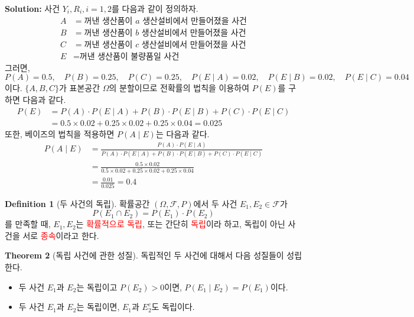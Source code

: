 \documentclass{article}
\theoremstyle{definition}
\newtheorem{theorem}{Theorem}
\newtheorem{definition}[theorem]{Definition}
\begin{document}
\noindent
\textbf{Solution:} 사건 $Y_i, R_i, i = 1, 2$를 다음과 같이 정의하자.
\begin{align*}
    A &= \text{꺼낸 생산품이 $a$ 생산설비에서 만들어졌을 사건}\\
    B &= \text{꺼낸 생산품이 $b$ 생산설비에서 만들어졌을 사건}\\
    C &= \text{꺼낸 생산품이 $c$ 생산설비에서 만들어졌을 사건}\\
    E &= \text{꺼낸 생산품이 불량품일 사건}
\end{align*}
그러면,
\begin{equation*}
    P(A) = 0.5, \quad P(B) = 0.25, \quad P(C) = 0.25, \quad P(E \mid A) = 0.02, \quad P(E \mid B) = 0.02, \quad P(E \mid C) = 0.04
\end{equation*}
이다. $\{A, B, C\}$가 표본공간 $\Omega$의 분할이므로 전확률의 법칙을 이용하여 $P(E)$를 구하면 다음과 같다.
\begin{align*}
P(E) &= P(A) \cdot P(E \mid A) + P(B) \cdot P(E \mid B) + P(C) \cdot P(E \mid C) \\
     &= 0.5 \times 0.02 + 0.25 \times 0.02 + 0.25 \times 0.04 = 0.025
\end{align*}    
또한, 베이즈의 법칙을 적용하면 $P(A \mid E)$는 다음과 같다.
\begin{align*}
    P(A \mid E) &= \frac{P(A) \cdot P(E \mid A)}{P(A) \cdot P(E \mid A) + P(B) \cdot P(E \mid B) + P(C) \cdot P(E \mid C)}\\
    &= \frac{0.5 \times 0.02}{0.5 \times 0.02 + 0.25 \times 0.02 + 0.25 \times 0.04}\\
    &= \frac{0.01}{0.025} = 0.4
\end{align*}

\begin{definition}[두 사건의 독립]
    확률공간 $(\Omega, \mathcal{F}, P)$에서 두 사건 $E_1, E_2 \in \mathcal{F}$가
    \begin{equation*}
        P(E_1 \cap E_2) = P(E_1) \cdot P(E_2)
    \end{equation*}
    를 만족할 때, $E_1, E_2$는 \textcolor{red}{확률적으로 독립}, 또는 간단히 \textcolor{red}{독립}이라 하고, 독립이 아닌 사건을 서로 \textcolor{red}{종속}이라고 한다.
\end{definition}

\begin{theorem}[독립 사건에 관한 성질]
    독립적인 두 사건에 대해서 다음 성질들이 성립한다.
    
    \begin{itemize}
        \item 두 사건 $E_1$과 $E_2$는 독립이고 $P(E_2) > 0$이면, $P(E_1 \mid E_2) = P(E_1)$이다.
        \item 두 사건 $E_1$과 $E_2$는 독립이면, $E_1$과 $E_2^c$도 독립이다.
    \end{itemize}
\end{theorem}
\end{document}
